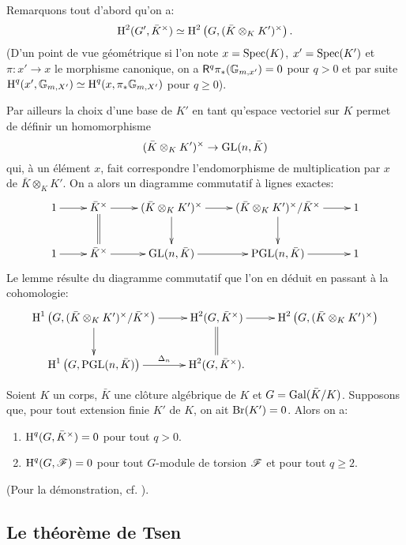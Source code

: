 \documentclass[oneside]{book}
\begin{document}
Remarquons tout d'abord qu'on a: 
\[
  \operatorname{H}^2(G',\bar K^\times) \simeq \operatorname{H}^2\left(G,(\bar K\otimes_K K')^\times\right)\text{.}
\]
(D'un point de vue géométrique si l'on note $x=\operatorname{Spec}(K)$, $x'=\operatorname{Spec}(K')$ et 
$\pi:x'\to x$ le morphisme canonique, on a $\mathsf{R}^q \pi_*(\mathbb{G}_{m,x'}) = 0$ pour 
$q>0$ et par suite $\operatorname{H}^q(x',\mathbb{G}_{m,X'})\simeq \operatorname{H}^q(x,\pi_*\mathbb{G}_{m,X'})$ pour 
$q\geqslant 0$). 

Par ailleurs la choix d'une base de $K'$ en tant qu'espace vectoriel sur $K$ 
permet de définir un homomorphisme 
\[
  (\bar K\otimes_K K')^\times \to \operatorname{GL}(n,\bar K)
\]
qui, à un élément $x$, fait correspondre l'endomorphisme de 
multiplication par $x$ de $\bar K\otimes_K K'$. On a alors un diagramme 
commutatif à lignes exactes: 
\[\xymatrix{
  1 \ar[r] 
    & \bar K^\times \ar[r] \ar@{=}[d]
    & (\bar K\otimes_K K')^\times \ar[r] \ar[d] 
    & (\bar K\otimes_K K')^\times / \bar K^\times \ar[r] \ar[d] 
    & 1 \\
  1 \ar[r] 
    & \bar K^\times \ar[r] 
    & \gl(n,\bar K) \ar[r] 
    & \pgl(n,\bar K) \ar[r] 
    & 1
}\]
Le lemme résulte du diagramme commutatif que l'on en déduit en passant 
à la cohomologie:
\[\xymatrix{
  \h^1\left(G,(\bar K\otimes_K K')^\times/\bar K^\times\right) \ar[r] \ar[d] 
    & \h^2(G,\bar K^\times) \ar[r] \ar@{=}[d]
    & \h^2\left(G,(\bar K\otimes_K K')^\times\right) \\
  \h^1\left(G,\pgl(n,\bar K)\right) \ar[r]^-{\Delta_n} 
    & \h^2(G,\bar K^\times) \text{.}
}\]





\begin{proposition}\label{I:3-1-6}
Soient $K$ un corps, $\bar K$ une clôture algébrique de $K$ et 
$G=\operatorname{Gal}(\bar K/K)$. Supposons que, pour tout extension finie $K'$ de $K$, on 
ait $\operatorname{Br}(K')=0$. Alors on a:
\begin{enumerate}[\indent i)]
  \item $\operatorname{H}^q(G,\bar K^\times) = 0$ pour tout $q>0$.
  \item $\operatorname{H}^q(G,\mathscr{F}) = 0$ pour tout $G$-module de torsion $\mathscr{F}$ et pour tout 
    $q\geqslant 2$.
\end{enumerate}
\end{proposition}

(Pour la démonstration, cf. \cite{14}).










\subsection{Le théorème de Tsen}\label{I:3-2}
\end{document}
